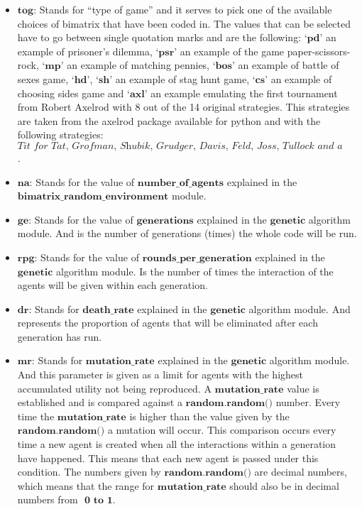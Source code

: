 \documentclass{book}
\begin{document}
\begin{itemize}
	\item $\textbf{tog:}$ Stands for ``type of game'' and it serves to pick one of the available choices of bimatrix that have been coded in. The values that can be selected have to go between single quotation marks and are the following: $\textbf{`pd'}$ an example of prisoner's dilemma, $\textbf{`psr'}$ an example of the game paper-scissors-rock, $\textbf{`mp'}$ an example of matching pennies, $\textbf{`bos'}$ an example of battle of sexes game, $\textbf{`hd'}$, $\textbf{`sh'}$ an example of stag hunt game, $\textbf{`cs'}$ an example of choosing sides game and $\textbf{`axl'}$ an example emulating the first tournament from Robert Axelrod with 8 out of the 14 original strategies. This strategies are taken from the axelrod package available for python and with the following strategies: $\textit{Tit for Tat, Grofman, Shubik, Grudger, Davis, Feld, Joss, Tullock and a Random strategy}$.
	\item$\textbf{na:}$ Stands for the value of $\textbf{number\_of\_agents}$ explained in the $\textbf{bimatrix\_random\_environment}$ module.
	\item $\textbf{ge:}$ Stands for the value of $\textbf{generations}$ explained in the $\textbf{genetic}$ algorithm module. And is the number of generations (times) the whole code will be run.
	\item $\textbf{rpg:}$ Stands for the value of $\textbf{rounds\_per\_generation}$ explained in the $\textbf{genetic}$  algorithm module. Is the number of times the interaction of the agents will be given within each generation. 
	\item $\textbf{dr:}$ Stands for $\textbf{death\_rate}$ explained in the $\textbf{genetic}$ algorithm module. And represents the proportion of agents that will be eliminated after each generation has run.
	\item $\textbf{mr:}$ Stands for $\textbf{mutation\_rate}$ explained in the $\textbf{genetic}$ algorithm module. And this parameter is given as a limit for agents with the highest accumulated utility not being reproduced. A $\textbf{mutation\_rate}$ value is established and is compared against a $\textbf{random.random()}$ number. Every time the $\textbf{mutation\_rate}$ is higher than the value given by the $\textbf{random.random()}$ a mutation will occur. This comparison occurs every time a new agent is created when all the interactions within a generation have happened. This means that each new agent is passed under this condition. The numbers given by $\textbf{random.random()}$ are decimal numbers, which means that the range for $\textbf{mutation\_rate}$ should also be in decimal numbers from $\textbf{ 0 to 1}$.

\end{itemize}
\end{document}
